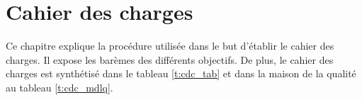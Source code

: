 

\chapter{Cahier des charges}
\label{s:cdc}

Ce chapitre explique la procédure utilisée dans le but d'établir le cahier des charges.
Il expose les barèmes des différents objectifs.
De plus, le cahier des charges est synthétisé dans le tableau \ref{t:cdc_tab} et dans la maison de la qualité au tableau \ref{t:cdc_mdlq}.








